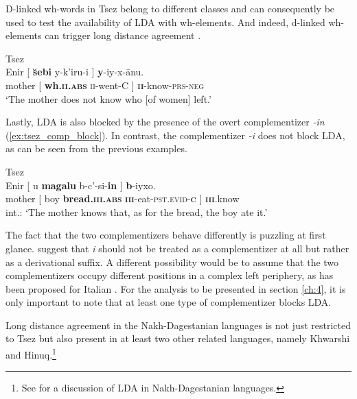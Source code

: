 \documentclass[output=paper
,modfonts
,nonflat]{langsci/langscibook}
\begin{document}
D-linked wh-words in Tsez belong to different classes and can consequently be used to test the availability of LDA with wh-elements. And indeed, d-linked wh-elements can trigger long distance agreement .
\begin{exe}
	\ex Tsez \citep[][fn. 20]{Polinsky_Potsdam2001} \label{ex:tsez_wh_dlinked}\\
		\gll Enir [ \textbf{\u{s}ebi} y-k'iru-\textipa{\textbeltl}i ] \textbf{y}-iy-x-\={a}nu.\\
			 mother [ \textbf{wh.\textsc{ii.abs}} \textsc{ii}-went-C ] \textbf{\textsc{ii}}-know-\textsc{prs-neg}\\
		\glt `The mother does not know who [of women] left.'
\end{exe}
Lastly, LDA is also blocked by the presence of the overt complementizer \textit{-\textipa{\textcrlambda}in} (\ref{ex:tsez_comp_block}). In contrast, the complementizer \textit{-\textipa{\textbeltl}i} does not block LDA, as can be seen from the previous examples.
\begin{exe}
	\ex Tsez \citep[][635]{Polinsky_Potsdam2001}\label{ex:tsez_comp_block}\\
		\gll *Enir [ u \textbf{magalu} b-c’-si-\textbf{\textipa{\textcrlambda}in} ] \textbf{b}-iyxo.\\
			 mother [ boy \textbf{bread.\textsc{\textbf{iii}.abs}} \textsc{\textbf{iii}}-eat-\textsc{pst.evid}-\textsc{\textbf{c}} ]	\textsc{\textbf{iii}}.know\\
		\glt int.: `The mother knows that, as for the bread, the boy ate it.'
\end{exe}
The fact that the two complementizers behave differently is puzzling at first glance. \citet[][fn 19]{Polinsky_Potsdam2001} suggest that \textit{\textipa{\textbeltl}i} should not be treated as a complementizer at all but rather as a derivational suffix. A different possibility would be to assume that the two complementizers occupy different positions in a complex left periphery, as has been proposed for Italian \citep{Ledgeway2005}. For the analysis to be presented in section \ref{ch:4}, it is only important to note that at least one type of complementizer blocks LDA.

Long distance agreement in the Nakh-Dagestanian languages is not just restricted to Tsez but also present in at least two other related languages, namely Khwarshi and Hinuq.\footnote{See  for a discussion of LDA in Nakh-Dagestanian languages.}
\end{document}
